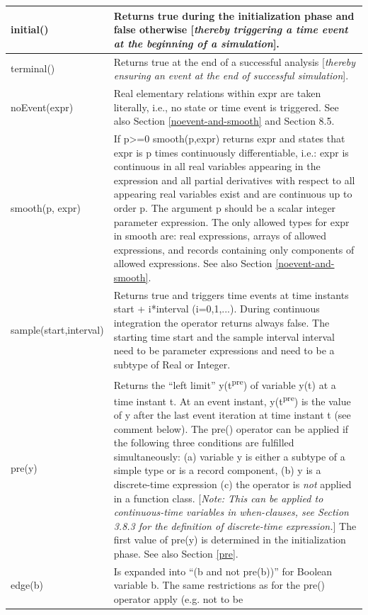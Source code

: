 \documentclass[10pt,a4paper]{report}
\def\Mcomment#1{{[}\emph{#1}{]}}
\begin{document}
\begin{longtable}{|p{3.2cm}|p{8cm}|}
\hline
initial() & Returns true during the initialization phase and false
otherwise \Mcomment{thereby triggering a time event at the beginning of a
simulation}.\\ \hline
terminal() & Returns true at the end of a successful analysis
\Mcomment{thereby ensuring an event at the end of successful
simulation}.\\ \hline
noEvent(expr) & Real elementary relations within expr are taken
literally, i.e., no state or time event is triggered. See also Section
\ref{noevent-and-smooth} and Section 8.5.\\ \hline
smooth(p, expr) & If p\textgreater{}=0 smooth(p,expr)
returns expr and states that expr is p times continuously
differentiable, i.e.: expr is continuous in all real variables appearing
in the expression and all partial derivatives with respect to all
appearing real variables exist and are continuous up to order
p. The argument p should be a scalar integer parameter
expression. The only allowed types for expr in smooth are: real
expressions, arrays of allowed expressions, and records containing only
components of allowed expressions. See also Section
\ref{noevent-and-smooth}.\\ \hline
sample(start,interval) & Returns true and triggers time events at time
instants start + i*interval (i=0,1,...). During continuous integration
the operator returns always false. The starting time start and the
sample interval interval need to be parameter expressions and need to be
a subtype of Real or Integer.\\ \hline
pre(y) & Returns the ``left limit'' y(t\textsuperscript{pre}) of
variable y(t) at a time instant t. At an event instant,
y(t\textsuperscript{pre}) is the value of y after the last event
iteration at time instant t (see comment below). The pre() operator can
be applied if the following three conditions are fulfilled
simultaneously: (a) variable y is either a subtype of a simple type or
is a record component, (b) y is a discrete-time expression (c) the
operator is \emph{not} applied in a function class. \Mcomment{Note: This
can be applied to continuous-time variables in when-clauses, see Section
3.8.3 for the definition of discrete-time expression.} The first
value of pre(y) is determined in the initialization phase. See also
Section \ref{pre}.\\ \hline
edge(b) & Is expanded into ``(b and not pre(b))'' for Boolean variable
b. The same restrictions as for the pre() operator apply (e.g. not to be

\end{longtable}
\end{document}
